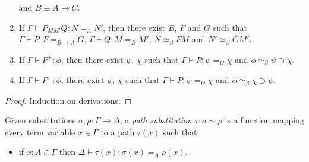 \begin{lemma}[Generation]
\begin{enumerate}
and $B \equiv A \rightarrow C$.
\item
If $\Gamma \vdash P_{M M'} Q : N =_A N'$, then there exist $B$, $F$ and $G$ such that $\Gamma \vdash P : F =_{B \rightarrow A} G$, $\Gamma \vdash Q : M =_B M'$, $N \simeq_\beta F M$
and $N' \simeq_\beta G M'$.
\item
If $\Gamma \vdash P^+ : \phi$, then there exist $\psi$, $\chi$ such that $\Gamma \vdash P : \psi =_\Omega \chi$ and $\phi \simeq_\beta \psi \supset \chi$.
\item
If $\Gamma \vdash P^- : \phi$, there exist $\psi$, $\chi$ such that $\Gamma \vdash P : \psi =_\Omega \chi$ and $\phi \simeq_\beta \chi \supset \psi$.
\end{enumerate}
\end{lemma}

\begin{proof}
Induction on derivations.
\end{proof}


Given substitutions $\sigma, \rho : \Gamma \rightarrow \Delta$, a \emph{path substitution} $\tau : \sigma \sim \rho$
is a function mapping every term variable $x \in \Gamma$ to a path $\tau(x)$ such that:
\begin{itemize}
\item
if $x : A \in \Gamma$ then $\Delta \vdash \tau(x) : \sigma(x) =_A \rho(x)$.
\end{itemize}

